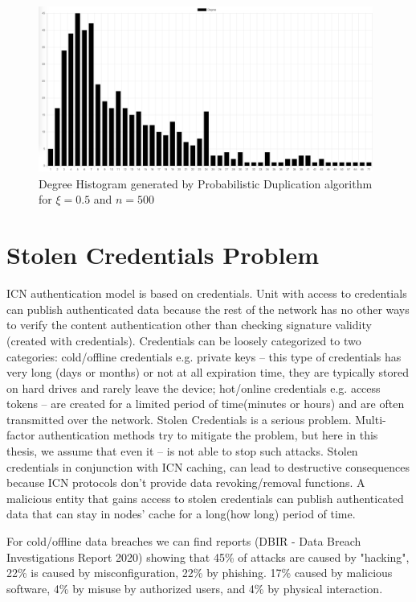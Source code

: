 \documentclass[nostrict]{szablonPG}
\begin{document}
\begin{figure}[h!]
    \includegraphics[width=11cm]{img/propDup500Hist.png}
    \centering
    \caption{Degree Histogram generated by Probabilistic Duplication algorithm for $\xi=0.5$ and $n = 500$}
    \label{fig:propdup500histogram}
\end{figure} 

\section{Stolen Credentials Problem}
ICN authentication model is based on credentials.  Unit with access to credentials can publish authenticated data because the rest of the network has no other ways to verify the content authentication other than checking signature validity (created with credentials). Credentials can be loosely categorized to two categories: cold/offline credentials e.g. private keys -- this type of credentials has very long (days or months) or not at all expiration time, they are typically stored on hard drives and rarely leave the device; hot/online credentials e.g. access tokens -- are created for a limited period of time(minutes or hours) and are often transmitted over the network. 
Stolen Credentials is a serious problem. Multi-factor authentication methods try to mitigate the problem, but here in this thesis, we assume that even it -- is not able to stop such attacks.
Stolen credentials in conjunction with ICN caching, can lead to destructive consequences because ICN protocols don't provide data revoking/removal functions. A malicious entity that gains access to stolen credentials can publish authenticated data that can stay in nodes' cache for a long(how long) period of time. 

For cold/offline data breaches we can find reports (DBIR - Data Breach Investigations Report 2020) showing that 45\% of attacks are caused by "hacking", 22\% is caused by misconfiguration, 22\% by phishing.  17\% caused by malicious software, 4\% by misuse by authorized users, and 4\% by physical interaction.
\end{document}
